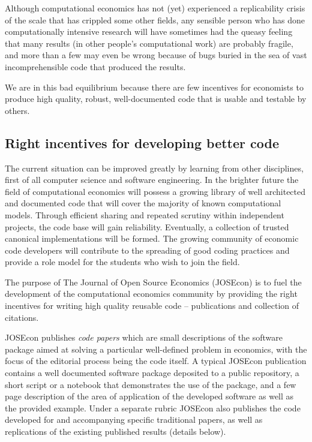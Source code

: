 Although computational economics has not (yet) experienced a replicability crisis of the scale that has crippled some other fields, any sensible person who has done computationally intensive research will have sometimes had the queasy feeling that many results (in other people's computational work) are probably fragile, and more than a few may even be wrong because of bugs buried in the sea of vast incomprehensible code that produced the results.

We are in this bad equilibrium because there are few incentives for economists to produce high quality, robust, well-documented code that is usable and testable by others.


\subsection{Right incentives for developing better code}

The current situation can be improved greatly by learning from other disciplines,
first of all computer science and software engineering.
In the brighter future the field of computational economics will possess a growing library 
of well architected and documented code that will cover the majority of known 
computational models.
Through efficient sharing and repeated scrutiny within independent projects,
the code base will gain reliability. Eventually, a collection of trusted canonical
implementations will be formed.
The growing community of economic code developers will contribute to the spreading 
of good coding practices and provide a role model for the students who wish to join the field.

The purpose of The Journal of Open Source Economics (JOSEcon) is to fuel the 
development of the computational economics community by providing the right incentives
for writing high quality reusable code -- publications and collection of citations.

JOSEcon publishes \emph{code papers} which are small descriptions of the software package
aimed at solving a particular well-defined problem in economics, with the focus
of the editorial process being the code itself.
A typical JOSEcon publication contains a well documented software package deposited to
a public repository, a short script or a notebook that demonstrates the use of the 
package, and a few page description of the area of application of the developed software
as well as the provided example.
Under a separate rubric JOSEcon also publishes the code developed for and accompanying 
specific traditional papers, as well as replications of the existing published results 
(details below).

